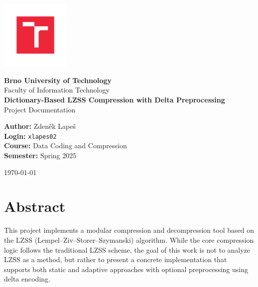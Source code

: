 \documentclass[a4paper,12pt]{article}
\begin{document}
    \begin{titlepage}
        \centering
        \vspace*{1cm}

        \includegraphics[width=0.25\textwidth]{template-fig/VUT_symbol_barevne_CMYK_CZ}\par\vspace{1cm} %

        {\Large\textbf{Brno University of Technology}}\\[0.5cm]
        {\large Faculty of Information Technology}\\[2cm]

        {\huge\bfseries Dictionary-Based LZSS Compression with Delta Preprocessing}\\[0.5cm]

        {\large Project Documentation}\\[2cm]

        \begin{flushleft}
            \textbf{Author:} Zdeněk Lapeš\\
            \textbf{Login:} \texttt{xlapes02}\\
            \textbf{Course:} Data Coding and Compression\\
            \textbf{Semester:} Spring 2025
        \end{flushleft}

        \vfill

        {\large \today}

    \end{titlepage}

    \tableofcontents
    \newpage

    \section*{Abstract}
    This project implements a modular compression and decompression tool based on the LZSS (Lempel–Ziv–Storer–Szymanski) algorithm. While the core compression logic follows the traditional LZSS scheme, the goal of this work is not to analyze LZSS as a method, but rather to present a concrete implementation that supports both static and adaptive approaches with optional preprocessing using delta encoding.
\end{document}
